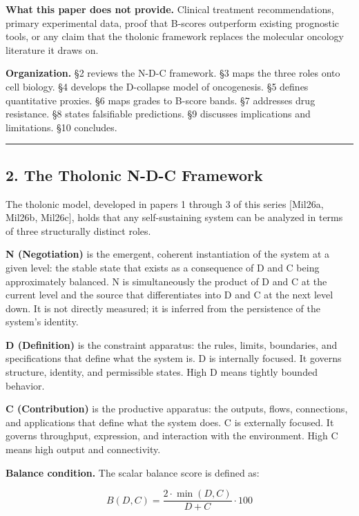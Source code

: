 \documentclass[
  11pt,
  letterpaper,
]{article}
\begin{document}
\textbf{What this paper does not provide.} Clinical treatment
recommendations, primary experimental data, proof that B-scores
outperform existing prognostic tools, or any claim that the tholonic
framework replaces the molecular oncology literature it draws on.

\textbf{Organization.} §2 reviews the N-D-C framework. §3 maps the three
roles onto cell biology. §4 develops the D-collapse model of
oncogenesis. §5 defines quantitative proxies. §6 maps grades to B-score
bands. §7 addresses drug resistance. §8 states falsifiable predictions.
§9 discusses implications and limitations. §10 concludes.

\begin{center}\rule{0.5\linewidth}{0.5pt}\end{center}

\subsection{2. The Tholonic N-D-C
Framework}\label{the-tholonic-n-d-c-framework}

The tholonic model, developed in papers 1 through 3 of this series
{[}Mil26a, Mil26b, Mil26c{]}, holds that any self-sustaining system can
be analyzed in terms of three structurally distinct roles.

\textbf{N (Negotiation)} is the emergent, coherent instantiation of the
system at a given level: the stable state that exists as a consequence
of D and C being approximately balanced. N is simultaneously the product
of D and C at the current level and the source that differentiates into
D and C at the next level down. It is not directly measured; it is
inferred from the persistence of the system's identity.

\textbf{D (Definition)} is the constraint apparatus: the rules, limits,
boundaries, and specifications that define what the system is. D is
internally focused. It governs structure, identity, and permissible
states. High D means tightly bounded behavior.

\textbf{C (Contribution)} is the productive apparatus: the outputs,
flows, connections, and applications that define what the system does. C
is externally focused. It governs throughput, expression, and
interaction with the environment. High C means high output and
connectivity.

\textbf{Balance condition.} The scalar balance score is defined as:

\[B(D,C) = \frac{2 \cdot \min(D,C)}{D + C} \cdot 100\]
\end{document}
